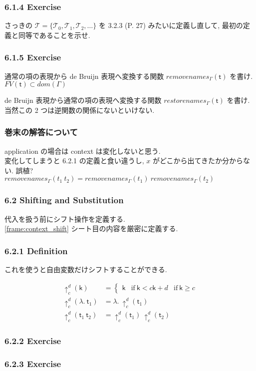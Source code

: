\documentclass[13pt,dvipdfm]{beamer}
\begin{document}
\frame
{
  \frametitle{6.1.4 Exercise}
  さっきの $\mathcal{T} = \{\mathcal{T}_0, \mathcal{T}_1, \mathcal{T}_2,\dots\}$
  を 3.2.3 (P. 27) みたいに定義し直して, 最初の定義と同等であることを示せ.
}

\frame
{
  \frametitle{6.1.5 Exercise}
  通常の項の表現から de Bruijn 表現へ変換する関数 $removenames_\Gamma (\mathsf{t})$ を書け.
  $FV(\mathsf{t}) \subset dom(\Gamma)$

  de Bruijn 表現から通常の項の表現へ変換する関数 $restorenames_\Gamma (\mathsf{t})$ を書け.\\
  当然この 2 つは逆関数の関係にないといけない.
}

\frame
{
  \frametitle{巻末の解答について}
  application の場合は context は変化しないと思う.\\
  変化してしまうと 6.2.1 の定義と食い違うし, $x$ がどこから出てきたか分からない. 誤植? \\
  $removenames_\Gamma (t_1\ t_2) = removenames_\Gamma (t_1)\ removenames_\Gamma (t_2)$
}

\frame
{
  \frametitle{6.2 Shifting and Substitution}
  代入を扱う前にシフト操作を定義する.\\
  \ref{frame:context_shift} シート目の内容を厳密に定義する.
}

\frame
{
  \frametitle{6.2.1 Definition}
  これを使うと自由変数だけシフトすることができる.
  \begin{definition}
    \begin{align*}
      \uparrow^d_c (\mathsf{k}) &=
      \begin{cases}
        \mathsf{k} & \text{if}\ \mathsf{k} < c
        \mathsf{k} + d & \text{if}\ \mathsf{k} \geq c
      \end{cases} \\
      \uparrow^d_c (\lambda.\ \mathsf{t}_1) &= \lambda.\ \uparrow^d_c (\mathsf{t}_1) \\
      \uparrow^d_c (\mathsf{t}_1\ \mathsf{t}_2) &= \uparrow^d_c (\mathsf{t}_1)\  \uparrow^d_c(\mathsf{t}_2)
    \end{align*}
  \end{definition}
}

\frame
{
  \frametitle{6.2.2 Exercise}

}

\frame
{
  \frametitle{6.2.3 Exercise}

}
\end{document}
